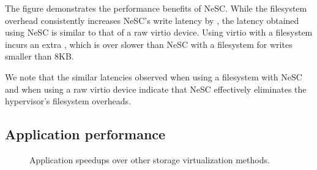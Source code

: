 The figure demonstrates the performance benefits of NeSC. While the filesystem overhead consistently increases NeSC's write latency by \us, the latency obtained using NeSC is similar to that of a raw virtio device. Using virtio with a filesystem incurs an extra \us, which is over  slower than NeSC with a filesystem for writes smaller than 8KB.

We note that the similar latencies observed when using a filesystem with NeSC and when using a raw virtio device indicate that NeSC effectively eliminates the hypervisor's filesystem overheads.

\subsection{Application performance}

\begin{figure}[t]

 \vspace*{-4ex}
  \centering
  \caption{Application speedups over other storage virtualization methods.\label{fig:apps}}

    
\end{figure}

